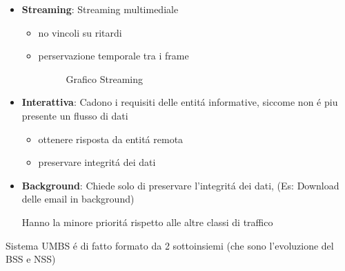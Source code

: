 \documentclass{article}
\begin{document}
\begin{samepage}
\begin{itemize}
\begin{itemize}
\begin{figure}[h]
                        \caption{Classe Conversazionale}
                    \end{figure}
                \item \'e sopportabile la perdita di alcuni frame, ma non il ritardo eccessivo dell'arrivo di ogni frame

            \end{itemize}

        \item \textbf{Streaming}: Streaming multimediale
            \begin{itemize}
                \item no vincoli su ritardi
                \item perservazione temporale tra i frame

                    \begin{figure}[h]
                        \centering
                            \caption{Grafico Streaming}
                        \end{figure}
                \end{itemize}

            \item \textbf{Interattiva}: Cadono i requisiti delle entit\'a informative, siccome non \'e piu presente un flusso di dati
                \begin{itemize}
                    \item ottenere risposta da entit\'a remota
                    \item preservare integrit\'a dei dati
                \end{itemize}

        \item \textbf{Background}: Chiede solo di preservare l'integrit\'a dei dati, (Es: Download delle email in background)

            Hanno la minore priorit\'a rispetto alle altre classi di traffico

    \end{itemize}
\end{samepage}
Sistema UMBS \'e di fatto formato da 2 sottoinsiemi (che sono l'evoluzione del BSS e NSS)
\end{document}
